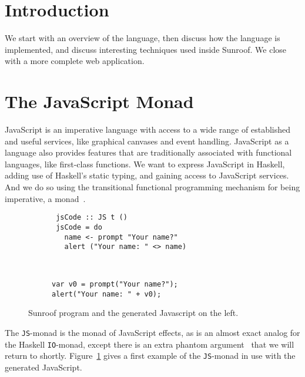 \documentclass{llncs}
\newcommand{\Src}[1]{{\tt{#1}}}
\newcommand{\IO}{\Src{IO}}
\newcommand{\JS}{\Src{JS}}
\begin{document}
\section{Introduction}

We start with an overview of the language, then discuss
how the language is implemented, and discuss interesting
techniques used inside Sunroof. We close with a more
complete web application.

\section{The JavaScript Monad}

JavaScript is an imperative language with access to a wide range
of established and useful services, like graphical canvases and event
handling. JavaScript as a language also provides features that are
traditionally associated with functional languages, like first-class 
functions. We want to express JavaScript in Haskell, adding use
of Haskell's static typing, and gaining access to JavaScript services.
And we do so using the transitional functional programming 
mechanism for being imperative, a monad~\cite{Moggi:91:ComputationMonads}.

\begin{figure}[t]
\vspace{-0.5cm}
\centering
\begin{subfigure}{0.45\textwidth}%
\begin{verbatim}
 jsCode :: JS t ()
 jsCode = do
   name <- prompt "Your name?"
   alert ("Your name: " <> name)
\end{verbatim}%
\end{subfigure}%
\hfill%
\begin{subfigure}{0.45\textwidth}
\vspace{0.25cm}%
\begin{verbatim}
  
  
var v0 = prompt("Your name?"); 
alert("Your name: " + v0);
\end{verbatim}%
\end{subfigure}%
\caption{Sunroof program and the generated Javascript on the left.}%
\label{fig:code-example}%
\end{figure}

The \JS-monad is the monad of JavaScript effects, as is an almost
exact analog for the Haskell \IO-monad, except there
is an extra phantom argument~\cite{Leijen:99:Phantom} that we will return
to shortly.  Figure~\ref{fig:code-example} gives a first example
of the \JS-monad in use with the generated JavaScript.
\end{document}

